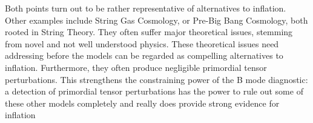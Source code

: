 \documentclass[a4paper,10pt]{article}
\begin{document}
Both points turn out to be rather representative of alternatives to inflation. Other examples include String Gas Cosmology, or Pre-Big Bang Cosmology, both rooted in String Theory. They often suffer major theoretical issues, stemming from novel and not well understood physics. These theoretical issues need addressing before the models can be regarded as compelling alternatives to inflation. Furthermore, they often produce negligible primordial tensor perturbations. This strengthens the constraining power of the B mode diagnostic: a detection of primordial tensor perturbations has the power to rule out some of these other models completely and really does provide strong evidence for inflation




\end{document}
